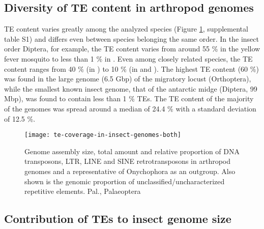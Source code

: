 \subsection{Diversity of TE content in arthropod
genomes}\label{diversity-of-te-content-in-arthropod-genomes}

TE content varies greatly among the analyzed species (Figure
\ref{fig:te-coverage}, supplemental table S1) and differs even between
species belonging the same order. In the insect order Diptera, for
example, the TE content varies from around 55 \% in the yellow fever
mosquito  to less than 1 \% in . Even among closely related  species,
the TE content ranges from 40 \% (in ) to 10 \%
(in  and ). The highest TE
content (60 \%) was found in the large genome (6.5 Gbp) of the migratory
locust  (Orthoptera), while the smallest
known insect genome, that of the antarctic midge  (Diptera, 99 Mbp), was found to contain less than 1 \% TEs.
The TE content of the majority of the genomes was spread around a median
of 24.4 \% with a standard deviation of 12.5 \%.

\begin{figure}[t]
\begin{center}
\texttt{[image: te-coverage-in-insect-genomes-both]}
\caption[TE coverage in arthropod genomes]{{Genome assembly size, total
amount and relative proportion of DNA transposons, LTR, LINE and SINE
retrotransposons in arthropod genomes and a representative of
Onychophora as an outgroup. Also shown is the genomic proportion of
unclassified/uncharacterized repetitive elements.  Pal., Palaeoptera%
}}
\label{fig:te-coverage}
\end{center}
\end{figure}

\subsection{Contribution of TEs to insect genome
size}\label{contribution-of-tes-to-insect-genome-size}

